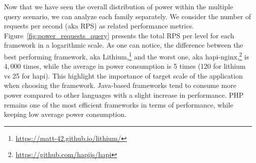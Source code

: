 \begin{table}[bth]
    \raggedright
    \caption{Average power consumption of frameworks based on the database type}
    \label{table:query_db_row}
\end{table}

Now that we have seen the overall distribution of power within the multiple query scenario, we can analyze each family separately.
We consider the number of requests per second (aka RPS) as related performance metrics. 
Figure~\ref{fig:power_requests_query} presents the total RPS per level for each framework in a logarithmic scale.
As one can notice, the difference between the best performing framework, aka Lithium,\footnote{\url{https://matt-42.github.io/lithium/}} and the worst one, aka hapi-nginx,\footnote{\url{https://github.com/hapijs/hapi}} is $4,000$ times, while the average in power consumption is 5 times (120 for lithium vs 25 for hapi).
This highlight the importance of target scale of the application when choosing the framework.
Java-based frameworks tend to consume more power compared to other languages with a slight increase in performance.
PHP remains one of the most efficient frameworks in terms of performance, while keeping low average power consumption.

